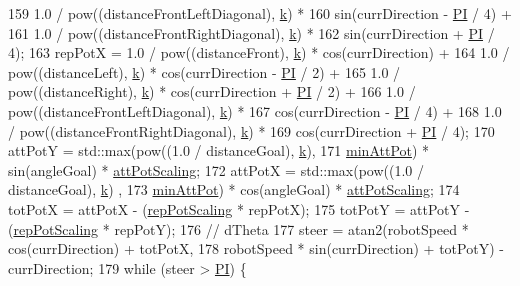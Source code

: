 \begin{DoxyCode}
159               1.0 / pow((distanceFrontLeftDiagonal), \hyperlink{classRobotPlanner_a18ebcf4ba23a817db1a2fda878120eb4}{k}) *
160               sin(currDirection - \hyperlink{Actor_8hpp_a598a3330b3c21701223ee0ca14316eca}{PI} / 4) +
161               1.0 / pow((distanceFrontRightDiagonal), \hyperlink{classRobotPlanner_a18ebcf4ba23a817db1a2fda878120eb4}{k}) *
162               sin(currDirection + \hyperlink{Actor_8hpp_a598a3330b3c21701223ee0ca14316eca}{PI} / 4);
163     repPotX = 1.0 / pow((distanceFront), \hyperlink{classRobotPlanner_a18ebcf4ba23a817db1a2fda878120eb4}{k}) * cos(currDirection) +
164               1.0 / pow((distanceLeft), \hyperlink{classRobotPlanner_a18ebcf4ba23a817db1a2fda878120eb4}{k}) * cos(currDirection - \hyperlink{Actor_8hpp_a598a3330b3c21701223ee0ca14316eca}{PI} / 2) +
165               1.0 / pow((distanceRight), \hyperlink{classRobotPlanner_a18ebcf4ba23a817db1a2fda878120eb4}{k}) * cos(currDirection + \hyperlink{Actor_8hpp_a598a3330b3c21701223ee0ca14316eca}{PI} / 2) +
166               1.0 / pow((distanceFrontLeftDiagonal), \hyperlink{classRobotPlanner_a18ebcf4ba23a817db1a2fda878120eb4}{k}) *
167               cos(currDirection - \hyperlink{Actor_8hpp_a598a3330b3c21701223ee0ca14316eca}{PI} / 4) +
168               1.0 / pow((distanceFrontRightDiagonal), \hyperlink{classRobotPlanner_a18ebcf4ba23a817db1a2fda878120eb4}{k}) *
169               cos(currDirection + \hyperlink{Actor_8hpp_a598a3330b3c21701223ee0ca14316eca}{PI} / 4);
170     attPotY = std::max(pow((1.0 / distanceGoal), \hyperlink{classRobotPlanner_a18ebcf4ba23a817db1a2fda878120eb4}{k}),
171                        \hyperlink{classRobotPlanner_a199d479764e8e96c37654486ddc1ef7d}{minAttPot}) * sin(angleGoal)  * \hyperlink{classRobotPlanner_aa68f0bb24256b470a8a4d13d858aef7f}{attPotScaling};
172     attPotX = std::max(pow((1.0 / distanceGoal), \hyperlink{classRobotPlanner_a18ebcf4ba23a817db1a2fda878120eb4}{k}) ,
173                        \hyperlink{classRobotPlanner_a199d479764e8e96c37654486ddc1ef7d}{minAttPot}) * cos(angleGoal) * \hyperlink{classRobotPlanner_aa68f0bb24256b470a8a4d13d858aef7f}{attPotScaling};
174     totPotX = attPotX - (\hyperlink{classRobotPlanner_a0b056d74826bddeb6dbd5a458aad0758}{repPotScaling} * repPotX);
175     totPotY = attPotY - (\hyperlink{classRobotPlanner_a0b056d74826bddeb6dbd5a458aad0758}{repPotScaling} * repPotY);
176     \textcolor{comment}{//  dTheta}
177     steer = atan2(robotSpeed * cos(currDirection) + totPotX,
178                   robotSpeed * sin(currDirection) + totPotY) - currDirection;
179     \textcolor{keywordflow}{while} (steer > \hyperlink{Actor_8hpp_a598a3330b3c21701223ee0ca14316eca}{PI}) \{

\end{DoxyCode}
